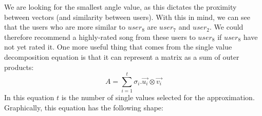 \documentclass[600paper, 11pt,twoside,openany]{kdp}
\begin{document}
\begin{center}

\end{center}
\par 
\vspace{-3pt}
\indent We are looking for the smallest angle value, as this dictates the proximity between vectors (and similarity between users). With this in mind, we can see that the users who are more similar to $user_8$ are $user_7$ and $user_2$. We could therefore recommend a highly-rated song from these users to $user_8$ if $user_8$ have not yet rated it.
\newpage
One more useful thing that comes from the single value decomposition equation is that it can represent a matrix as a sum of outer products:
\[A = \sum_{i=1}^t \sigma_i. \overrightarrow{u_i} \otimes \overrightarrow{v_i}\]
\indent In this equation $t$ is the number of single values selected for the approximation. Graphically, this equation has the following shape:
\end{document}
